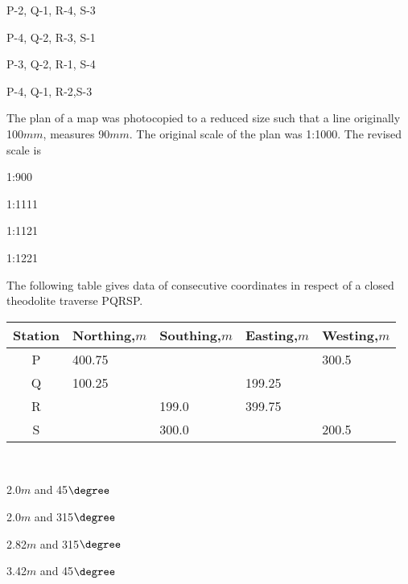 \begin{enumerate}
\begin{multicols}{4}
\item P-2, Q-1, R-4, S-3
\item P-4, Q-2, R-3, S-1
\item P-3, Q-2, R-1, S-4
\item P-4, Q-1, R-2,S-3
\end{multicols}
\end{enumerate}
\item The plan of a map was photocopied to a reduced size such that a line originally 100$mm$, measures 90$mm$. The original scale of the plan was 1:1000. The revised scale is
\begin{enumerate}
\begin{multicols}{4}
\item 1:900
\item 1:1111
\item 1:1121
\item 1:1221
\end{multicols}
\end{enumerate}
\item The following table gives data of consecutive coordinates in respect of a closed theodolite traverse PQRSP. \\
\begin{table}[h]
    \centering
    \begin{tabular}{|c|p{2cm}|p{2cm}|p{2cm}|p{2cm}|}
    \hline
    Station & Northing,$m$ & Southing,$m$ & Easting,$m$ & Westing,$m$\\
    \hline
    P & 400.75 &  &  & 300.5 \\
    \hline
    Q & 100.25 &  & 199.25 &  \\
    \hline
    R &  & 199.0 & 399.75 &  \\
    \hline
    S &  & 300.0 &  & 200.5 \\
    \hline
\end{tabular}
\end{table}\\
\begin{enumerate}
\begin{multicols}{4}
\item 2.0$m$ and 45$\degree$
\item 2.0$m$ and 315$\degree$
\item 2.82$m$ and 315$\degree$
\item 3.42$m$ and 45$\degree$
\end{multicols}
\end{enumerate}

